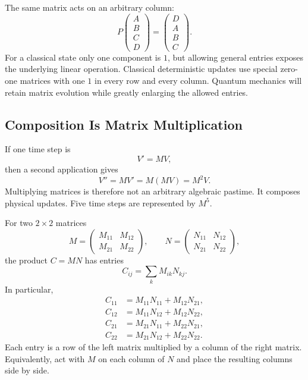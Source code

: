 The same matrix acts on an arbitrary column:
\begin{equation}
  P
  \begin{pmatrix}A\\B\\C\\D\end{pmatrix}
  =
  \begin{pmatrix}D\\A\\B\\C\end{pmatrix}.
  \label{eq:l01-cyclic-shift}
\end{equation}
For a classical state only one component is \(1\), but allowing general entries exposes the underlying linear operation. Classical deterministic updates use special zero-one matrices with one \(1\) in every row and every column. Quantum mechanics will retain matrix evolution while greatly enlarging the allowed entries.

\subsection{Composition Is Matrix Multiplication}

If one time step is
\begin{equation}
  V'=MV,
\end{equation}
then a second application gives
\begin{equation}
  V''=MV'=M(MV)=M^2V.
  \label{eq:l01-two-updates}
\end{equation}
Multiplying matrices is therefore not an arbitrary algebraic pastime. It composes physical updates. Five time steps are represented by \(M^5\).

For two \(2\times2\) matrices
\begin{equation}
  M=
  \begin{pmatrix}
    M_{11}&M_{12}\\
    M_{21}&M_{22}
  \end{pmatrix},
  \qquad
  N=
  \begin{pmatrix}
    N_{11}&N_{12}\\
    N_{21}&N_{22}
  \end{pmatrix},
\end{equation}
the product \(C=MN\) has entries
\begin{equation}
  C_{ij}=\sum_k M_{ik}N_{kj}.
  \label{eq:l01-matrix-product}
\end{equation}
In particular,
\begin{align}
  C_{11}&=M_{11}N_{11}+M_{12}N_{21},\\
  C_{12}&=M_{11}N_{12}+M_{12}N_{22},\\
  C_{21}&=M_{21}N_{11}+M_{22}N_{21},\\
  C_{22}&=M_{21}N_{12}+M_{22}N_{22}.
\end{align}
Each entry is a row of the left matrix multiplied by a column of the right matrix. Equivalently, act with \(M\) on each column of \(N\) and place the resulting columns side by side.


